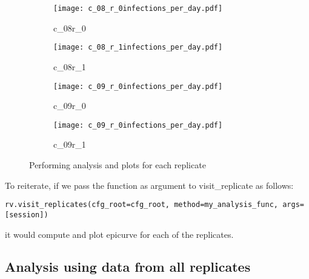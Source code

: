 \documentclass[11]{report}
\begin{document}
\begin{figure}
\begin{subfigure}{.5\textwidth}
  \centering
  \texttt{[image: c\_08\_r\_0infections\_per\_day.pdf]}
  \caption{c\_08r\_0}
  \label{fig:sfig1}
\end{subfigure}%
\begin{subfigure}{.5\textwidth}
  \centering
  \texttt{[image: c\_08\_r\_1infections\_per\_day.pdf]}
  \caption{c\_08r\_1}
  \label{fig:sfig2}
\end{subfigure}
\begin{subfigure}{.5\textwidth}
  \centering
  \texttt{[image: c\_09\_r\_0infections\_per\_day.pdf]}
  \caption{c\_09r\_0}
  \label{fig:sfig2}
\end{subfigure}
\begin{subfigure}{.5\textwidth}
  \centering
  \texttt{[image: c\_09\_r\_0infections\_per\_day.pdf]}
  \caption{c\_09r\_1}
  \label{fig:sfig2}
\end{subfigure}
\caption{Performing analysis and  plots for each replicate}
\label{fig:fig}
\end{figure}


To reiterate, if we pass the function as argument to  visit\_replicate as follows:
\begin{verbatim}
rv.visit_replicates(cfg_root=cfg_root, method=my_analysis_func, args=[session])
\end{verbatim}
it would compute and plot epicurve for each of the replicates. 

\subsection{Analysis using data from all replicates}
\end{document}
